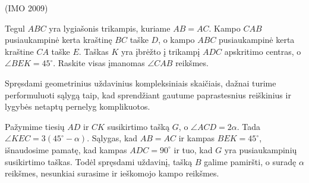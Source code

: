 \documentclass[11pt,a4paper,twoside]{book}
\begin{document}
\begin{pavnr}
(IMO 2009)

Tegul $ABC$ yra lygiašonis trikampis, kuriame $AB =
AC$. Kampo $CAB$ pusiaukampinė kerta kraštinę $BC$ taške $D$, o kampo
$ABC$ pusiaukampinė kerta kraštine $CA$ taške $E$. Taškas $K$ yra įbrėžto
į trikampį $ADC$ apskritimo centras, o $\angle BEK = 45^{\circ}$. Raskite visas
įmanomas $\angle CAB$ reikšmes.
\end{pavnr}
\begin{sprendimas}
Spręsdami geometrinius uždavinius kompleksiniais skaičiais, dažnai turime performuluoti sąlygą taip, kad sprendžiant gautume paprastesnius reiškinius ir lygybės netaptų pernelyg komplikuotos. 

Pažymime tiesių $AD$ ir $CK$ susikirtimo tašką $G$, o $\angle ACD = 2\alpha$. Tada $\angle KEC=3(45^{\circ}-\alpha).$ Sąlygas, kad $AB=AC$ ir kampas $BEK=45^\circ$, išnaudosime pamatę, kad kampas $ADC=90^\circ$ ir tuo, kad $G$ yra pusiaukampinių susikirtimo taškas. Todėl spręsdami uždavinį, tašką $B$ galime pamiršti, o suradę $\alpha$ reikšmes, nesunkiai surasime ir ieškomojo kampo reikšmes.


\end{sprendimas}
\end{document}
